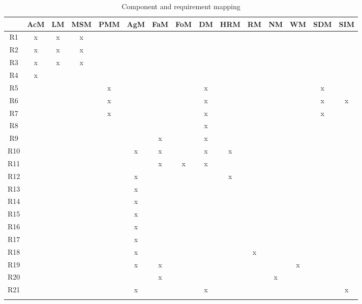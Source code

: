 \documentclass[table, 12pt]{article}
\begin{document}
\begin{longtable}{|c|c|c|c|c|c|c|c|c|c|c|c|c|c|c|}

    \hline
    & \cellcolor{blue!30}AcM & \cellcolor{blue!30}LM & \cellcolor{blue!30}MSM & \cellcolor{blue!30}PMM & \cellcolor{blue!30}AgM & \cellcolor{blue!30}FaM & \cellcolor{blue!30}FoM & \cellcolor{blue!30}DM & \cellcolor{blue!30}HRM & \cellcolor{blue!30}RM & \cellcolor{blue!30}NM & \cellcolor{blue!30}WM & \cellcolor{blue!30}SDM & \cellcolor{blue!30}SIM\\\hline
    \cellcolor{SpringGreen!50}R1 & x & x & x &    &       &       &   &       &  &&    &   &&\\\hline
    \cellcolor{SpringGreen!50}R2 & x & x & x &    &       &       &   &       &  &&    &   &&\\\hline
    \cellcolor{SpringGreen!50}R3 & x & x & x &    &       &       &   &       &  &&    &   &&\\\hline
    \cellcolor{SpringGreen!50}R4 & x &  &  &    &       &       &   &       &  &&    &   &&\\\hline
    \cellcolor{SpringGreen!50}R5 &    & & & x & & && x && & &&x&\\\hline
    \cellcolor{SpringGreen!50}R6 &    & & & x & & && x && & &&x&x\\\hline
    \cellcolor{SpringGreen!50}R7 &    & & & x & & && x && & &&x&\\\hline
    \cellcolor{SpringGreen!50}R8 &    & & & & & && x && & &&&\\\hline
    \cellcolor{SpringGreen!50}R9 &    & & & & & x && x && & &&&\\\hline
    \cellcolor{SpringGreen!50}R10 &    & & & & x & x && x & x & & &&&\\\hline
    \cellcolor{SpringGreen!50}R11 &    & & & & & x & x & x && & &&&\\\hline
    \cellcolor{SpringGreen!50}R12 &    & & & & x &  &&  & x & & &&&\\\hline
    \cellcolor{SpringGreen!50}R13 &    & & & & x &  &&  &  & & &&&\\\hline
    \cellcolor{SpringGreen!50}R14 &    & & & & x &  &&  &  & & &&&\\\hline
    \cellcolor{SpringGreen!50}R15 &    & & & & x &  &&  &  & & &&&\\\hline
    \cellcolor{SpringGreen!50}R16 &    & & & & x &  &&  &  & & &&&\\\hline
    \cellcolor{SpringGreen!50}R17 &    & & & & x &  &&  &  & & &&&\\\hline
    \cellcolor{SpringGreen!50}R18 &    & & & & x &  &&  &  & x & &&&\\\hline
    \cellcolor{SpringGreen!50}R19 &    & & & & x & x &&  &  & & & x &&\\\hline
    \cellcolor{SpringGreen!50}R20 &    & & & & & x &&  &  & & x &&&\\\hline
    \cellcolor{SpringGreen!50}R21 & &&&& x &&&x &&&&&&x\\\hline
    \caption{Component and requirement mapping}\\
\end{longtable}
\end{document}
